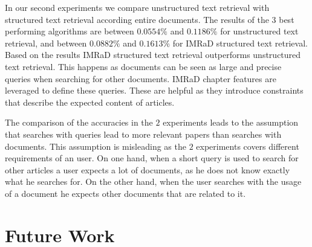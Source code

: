 In our second experiments we compare unstructured text retrieval with structured text retrieval according entire documents. The results of the $3$ best performing algorithms are between $0.0554\%$ and $0.1186\%$ for unstructured text retrieval, and between $0.0882\%$ and $0.1613\%$ for IMRaD structured text retrieval. Based on the results IMRaD structured text retrieval outperforms unstructured text retrieval. This happens as documents can be seen as large and precise queries when searching for other documents. IMRaD chapter features are leveraged to define these queries. These are helpful as they introduce constraints that describe the expected content of articles.

The comparison of the accuracies in the $2$ experiments leads to the assumption that searches with queries lead to more relevant papers than searches with documents. This assumption is misleading as the $2$ experiments covers different requirements of an user. On one hand, when a short query is used to search for other articles a user expects a lot of documents, as he does not know exactly what he searches for. On the other hand, when the user searches with the usage of a document he expects other documents that are related to it.




\section{Future Work}
\label{sec:future_work}






